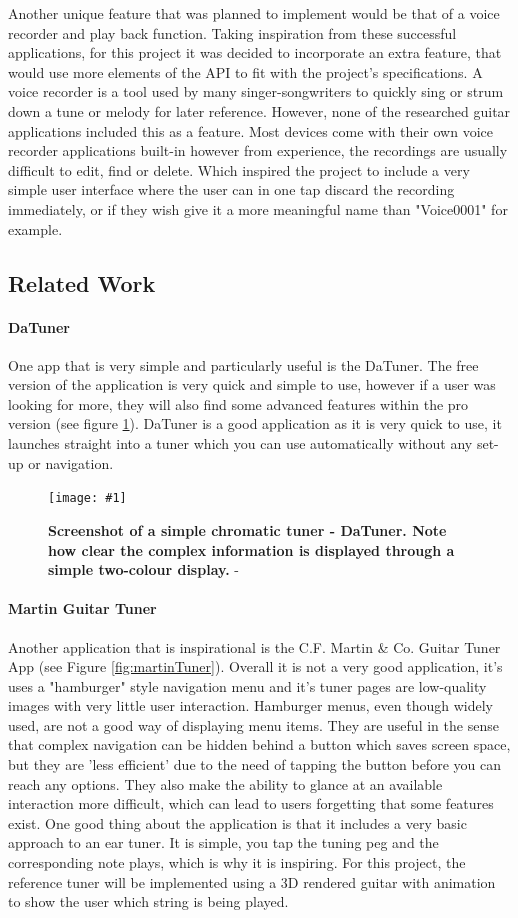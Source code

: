 \documentclass[conference]{acmsiggraph}
\newcommand{\figuremacroW}[4]{
	\begin{figure}[H] %
		\centering
		\texttt{[image: \#1]}
		\caption[#2]{\textbf{#2} - #3}
		\label{fig:#1}
	\end{figure}
}
\begin{document}
Another unique feature that was planned to implement would be that of a voice recorder and play back function. Taking inspiration from these successful applications, for this project it was decided to incorporate an extra feature, that would use more elements of the API to fit with the project's specifications. A voice recorder is a tool used by many singer-songwriters to quickly sing or strum down a tune or melody for later reference. However, none of the researched guitar applications included this as a feature. Most devices come with their own voice recorder applications built-in however from experience, the recordings are usually difficult to edit, find or delete. Which inspired the project to include a very simple user interface where the user can in one tap discard the recording immediately, or if they wish give it a more meaningful name than "Voice0001" for example.  

\subsection{Related Work}

\paragraph{DaTuner} One app that is very simple and particularly useful is the DaTuner. The free version of the application is very quick and simple to use, however if a user was looking for more, they will also find some advanced features within the pro version (see figure \ref{fig:daTune}). DaTuner is a good application as it is very quick to use, it launches straight into a tuner which you can use automatically without any set-up or navigation.

\figuremacroW
{daTune}
{Screenshot of a simple chromatic tuner - DaTuner. Note how clear the complex information is displayed through a simple two-colour display.}
{\protect\cite{DaTune}}
{1.0}

\paragraph{Martin Guitar Tuner} Another application that is inspirational is the C.F. Martin \& Co. Guitar Tuner App (see Figure \ref{fig:martinTuner}). Overall it is not a very good application, it's uses a "hamburger" style navigation menu and it's tuner pages are low-quality images with very little user interaction. Hamburger menus, even though widely used, are not a good way of displaying menu items. They are useful in the sense that complex navigation can be hidden behind a button which saves screen space, but they are 'less efficient' due to the need of tapping the button before you can reach any options. They also make the ability to glance at an available interaction more difficult, which can lead to users forgetting that some features exist. \cite{hamburger} One good thing about the application is that it includes a very basic approach to an ear tuner. It is simple, you tap the tuning peg and the corresponding note plays, which is why it is inspiring. For this project, the reference tuner will be implemented using a 3D rendered guitar with animation to show the user which string is being played.
\end{document}
